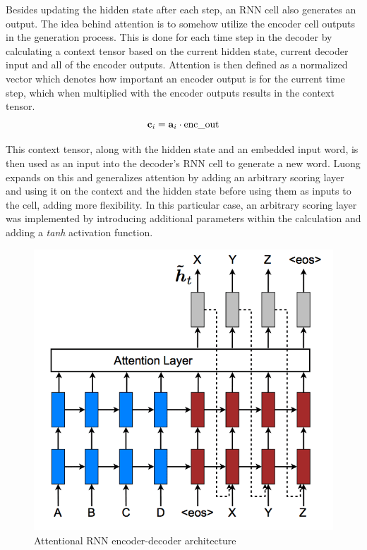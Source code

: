 \documentclass{article}
\begin{document}
Besides updating the hidden state after each step, an RNN cell also generates an output. The idea behind attention is to somehow utilize the encoder cell outputs in the generation process. This is done for each time step in the decoder by calculating a context tensor based on the current hidden state, current decoder input and all of the encoder outputs. Attention is then defined as a normalized vector which denotes how important an encoder output is for the current time step, which when multiplied with the encoder outputs results in the context tensor.
\begin{equation}
    \textbf{c}_i = \textbf{a}_i \cdot \textnormal{enc\_out}
\end{equation}

This context tensor, along with the hidden state and an embedded input word, is then used as an input into the decoder's RNN cell to generate a new word. Luong expands on this and generalizes attention by adding an arbitrary scoring layer and using it on the context and the hidden state before using them as inputs to the cell, adding more flexibility. In this particular case, an arbitrary scoring layer was implemented by introducing additional parameters within the calculation and adding a \textit{tanh} activation function.

\begin{figure}[H]
    \centering
    \includegraphics[scale=0.55]{images/attnencdec.png}
    \caption{Attentional RNN encoder-decoder architecture \citep{luong}}
\end{figure}
\end{document}
